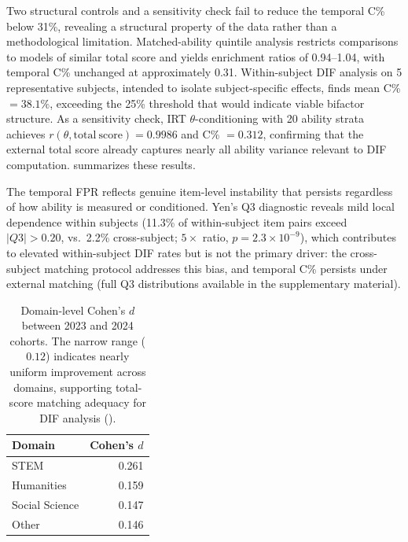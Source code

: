 Two structural controls and a sensitivity check fail to reduce the temporal C\% below 31\%, revealing a structural property of the data rather than a methodological limitation. Matched-ability quintile analysis restricts comparisons to models of similar total score and yields enrichment ratios of 0.94--1.04, with temporal C\% unchanged at approximately 0.31. Within-subject DIF analysis on 5 representative subjects, intended to isolate subject-specific effects, finds mean C\% $= 38.1\%$, exceeding the 25\% threshold that would indicate viable bifactor structure. As a sensitivity check, IRT $\theta$-conditioning with 20 ability strata achieves $r(\theta, \mathrm{total\ score}) = 0.9986$ and C\% $= 0.312$, confirming that the external total score already captures nearly all ability variance relevant to DIF computation.  summarizes these results.

The temporal FPR reflects genuine item-level instability that persists regardless of how ability is measured or conditioned. Yen's Q3 diagnostic reveals mild local dependence within subjects (11.3\% of within-subject item pairs exceed $|Q3| > 0.20$, vs.\ 2.2\% cross-subject; $5{\times}$ ratio, $p = 2.3 \times 10^{-9}$), which contributes to elevated within-subject DIF rates but is not the primary driver: the cross-subject matching protocol addresses this bias, and temporal C\% persists under external matching (full Q3 distributions available in the supplementary material).

\begin{table}[h]
\centering
\caption{Domain-level Cohen's $d$ between 2023 and 2024 cohorts. The narrow range ($0.12$) indicates nearly uniform improvement across domains, supporting total-score matching adequacy for DIF analysis ().}
\label{tab:domain_cohens_d}
\small
\begin{tabular}{lr}
\toprule
Domain & Cohen's $d$ \\
\midrule
STEM & 0.261 \\
Humanities & 0.159 \\
Social Science & 0.147 \\
Other & 0.146 \\
\bottomrule
\end{tabular}
\end{table}

